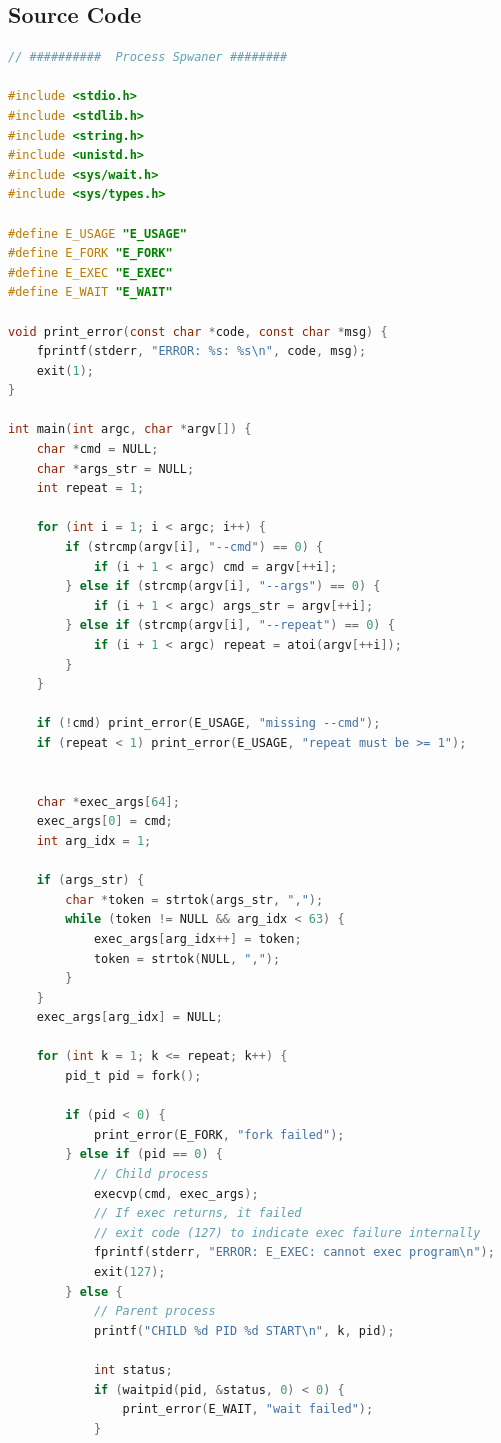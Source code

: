 \subsection{Source Code}
\begin{lstlisting}[language=C, caption={spawnwait.c}]
// ##########  Process Spwaner ########

#include <stdio.h>
#include <stdlib.h>
#include <string.h>
#include <unistd.h>
#include <sys/wait.h>
#include <sys/types.h>

#define E_USAGE "E_USAGE"
#define E_FORK "E_FORK"
#define E_EXEC "E_EXEC"
#define E_WAIT "E_WAIT"

void print_error(const char *code, const char *msg) {
    fprintf(stderr, "ERROR: %s: %s\n", code, msg);
    exit(1);
}

int main(int argc, char *argv[]) {
    char *cmd = NULL;
    char *args_str = NULL;
    int repeat = 1;

    for (int i = 1; i < argc; i++) {
        if (strcmp(argv[i], "--cmd") == 0) {
            if (i + 1 < argc) cmd = argv[++i];
        } else if (strcmp(argv[i], "--args") == 0) {
            if (i + 1 < argc) args_str = argv[++i];
        } else if (strcmp(argv[i], "--repeat") == 0) {
            if (i + 1 < argc) repeat = atoi(argv[++i]);
        }
    }

    if (!cmd) print_error(E_USAGE, "missing --cmd");
    if (repeat < 1) print_error(E_USAGE, "repeat must be >= 1");

    
    char *exec_args[64];
    exec_args[0] = cmd;
    int arg_idx = 1;

    if (args_str) {
        char *token = strtok(args_str, ",");
        while (token != NULL && arg_idx < 63) {
            exec_args[arg_idx++] = token;
            token = strtok(NULL, ",");
        }
    }
    exec_args[arg_idx] = NULL;

    for (int k = 1; k <= repeat; k++) {
        pid_t pid = fork();

        if (pid < 0) {
            print_error(E_FORK, "fork failed");
        } else if (pid == 0) {
            // Child process
            execvp(cmd, exec_args);
            // If exec returns, it failed
            // exit code (127) to indicate exec failure internally
            fprintf(stderr, "ERROR: E_EXEC: cannot exec program\n");
            exit(127); 
        } else {
            // Parent process
            printf("CHILD %d PID %d START\n", k, pid);
            
            int status;
            if (waitpid(pid, &status, 0) < 0) {
                print_error(E_WAIT, "wait failed");
            }


\end{lstlisting}

